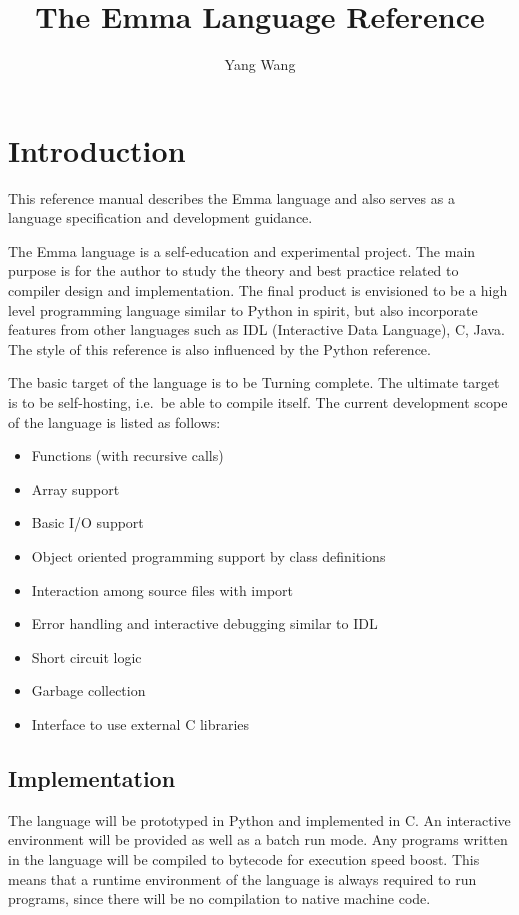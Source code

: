 \documentclass[10pt,a4paper]{article}
\author{Yang Wang}
\date{}
\title{The Emma Language Reference}
\begin{document}
\maketitle
\tableofcontents

\section{Introduction}
This reference manual describes the Emma language and also serves as a  
language specification and development guidance.

The Emma language is a self-education and experimental project. 
The main purpose is for the author to study the theory and best practice related
to compiler design and implementation. 
The final product is envisioned to be a high level programming language similar
to Python in spirit, but also incorporate features from other languages such as
IDL (Interactive Data Language), C, Java. The style of this reference is also
influenced by the Python reference.

The basic target of the language is to be Turning complete. The ultimate
target is to be self-hosting, i.e.\ be able to compile itself.
The current development scope of the language is listed as follows:

\begin{itemize}
\item Functions (with recursive calls)
\item Array support
\item Basic I/O support
\item Object oriented programming support by class definitions
\item Interaction among source files with import
\item Error handling and interactive debugging similar to IDL
\item Short circuit logic
\item Garbage collection
\item Interface to use external C libraries
\end{itemize}


\subsection{Implementation}
The language will be prototyped in Python and implemented in C. 
An interactive environment will be provided as well as a batch
run mode. Any programs written in the language will be compiled
to bytecode for execution speed boost. This means
that a runtime environment of the language is always required to run
programs, since there will be no compilation to native machine code.
\end{document}
